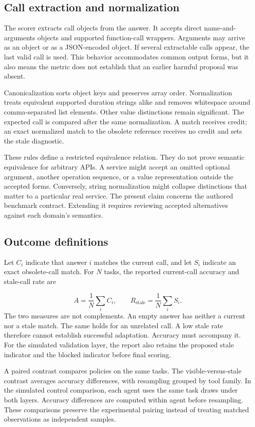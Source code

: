 \documentclass{article}
\begin{document}
\subsection{Call extraction and normalization}
The scorer extracts call objects from the answer. It accepts direct name-and-arguments objects and supported function-call wrappers. Arguments may arrive as an object or as a JSON-encoded object. If several extractable calls appear, the last valid call is used. This behavior accommodates common output forms, but it also means the metric does not establish that an earlier harmful proposal was absent.\par
Canonicalization sorts object keys and preserves array order. Normalization treats equivalent supported duration strings alike and removes whitespace around comma-separated list elements. Other value distinctions remain significant. The expected call is compared after the same normalization. A match receives credit; an exact normalized match to the obsolete reference receives no credit and sets the stale diagnostic.\par
These rules define a restricted equivalence relation. They do not prove semantic equivalence for arbitrary APIs. A service might accept an omitted optional argument, another operation sequence, or a value representation outside the accepted forms. Conversely, string normalization might collapse distinctions that matter to a particular real service. The present claim concerns the authored benchmark contract. Extending it requires reviewing accepted alternatives against each domain's semantics.\par
\subsection{Outcome definitions}
Let $C_i$ indicate that answer $i$ matches the current call, and let $S_i$ indicate an exact obsolete-call match. For $N$ tasks, the reported current-call accuracy and stale-call rate are\par
\[ A=\frac{1}{N}\sum_i C_i,\qquad R_{\mathrm{stale}}=\frac{1}{N}\sum_i S_i. \]
The two measures are not complements. An empty answer has neither a current nor a stale match. The same holds for an unrelated call. A low stale rate therefore cannot establish successful adaptation. Accuracy must accompany it. For the simulated validation layer, the report also retains the proposed stale indicator and the blocked indicator before final scoring.\par
A paired contrast compares policies on the same tasks. The visible-versus-stale contrast averages accuracy differences, with resampling grouped by tool family. In the simulated control comparison, each agent uses the same task draws under both layers. Accuracy differences are computed within agent before resampling. These comparisons preserve the experimental pairing instead of treating matched observations as independent samples.\par
\end{document}
